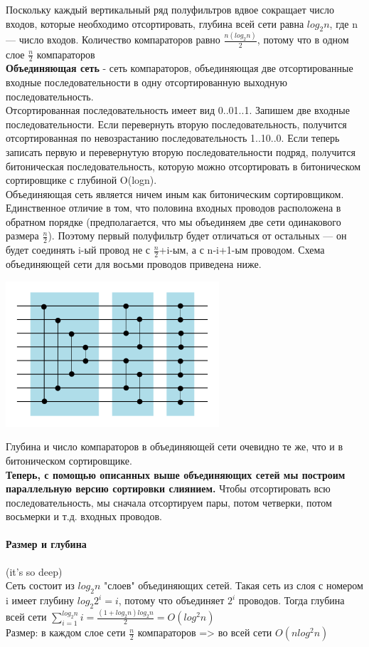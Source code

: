 \documentclass[a4paper,10pt]{article}
\begin{document}
 Поскольку каждый вертикальный ряд полуфильтров вдвое сокращает число входов, которые необходимо отсортировать, глубина всей сети равна $log_2n$, где n — число входов. Количество компараторов равно $\frac{n(log_2n)}{2}$, потому что в одном слое $\frac{n}{2}$ компараторов\\
\textbf{Объединяющая сеть} - сеть компараторов, объединяющая две отсортированные входные последовательности в одну отсортированную выходную последовательность.\\
Отсортированная последовательность имеет вид 0..01..1. Запишем две входные последовательности. Если перевернуть вторую последовательность, получится отсортированная по невозрастанию последовательность 1..10..0. Если теперь записать первую и перевернутую вторую последовательности подряд, получится битоническая последовательность, которую можно отсортировать в битоническом сортировщике с глубиной O(logn).\\
Объединяющая сеть является ничем иным как битоническим сортировщиком. Единственное отличие в том, что половина входных проводов расположена в обратном порядке (предполагается, что мы объединяем две сети одинакового размера $\frac{n}{2}$). Поэтому первый полуфильтр будет отличаться от остальных — он будет соединять i-ый провод не с $\frac{n}{2}$+i-ым, а с n-i+1-ым проводом. Схема объединяющей сети для восьми проводов приведена ниже.
\begin{center}\includegraphics[scale=0.5]{snet3.png}\end{center}
Глубина и число компараторов в объединяющей сети очевидно те же, что и в битоническом сортировщике.\\
\textbf{Теперь, с помощью описанных выше объединяющих сетей мы построим параллельную версию сортировки слиянием.}
Чтобы отсортировать всю последовательность, мы сначала отсортируем пары, потом четверки, потом восьмерки и т.д. входных проводов.\\
\paragraph{Размер и глубина}(it's so deep)\\
Сеть состоит из $log_2n$ "слоев" объединяющих сетей. Такая сеть из слоя с номером i имеет глубину $log_2 2^i = i$, потому что объединяет $2^i$ проводов. Тогда глубина всей сети $\sum_{i=1}^{log_2n}{i}=\frac{(1+log_2n)log_2n}{2} = O(log^2n)$\\
Размер: в каждом слое сети $\frac{n}{2}$ компараторов => во всей сети $O(nlog^2n)$
\end{document}
